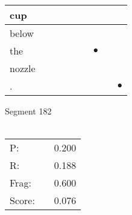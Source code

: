 \documentclass[landscape]{article}
\newcommand{\ssp}{\hspace{2pt}}
\newcommand{\mex}{\cellcolor{g}$\bullet$}
\begin{document}
\begin{tabular}{|l|p{10pt}|p{10pt}|p{10pt}|p{10pt}|p{10pt}|p{10pt}|p{10pt}|p{10pt}|}
\hline
\ssp cup \ssp&\hspace{2pt}&\hspace{2pt}&\hspace{2pt}&\hspace{2pt}&\hspace{2pt}&\hspace{2pt}&\hspace{2pt}&\hspace{2pt}\\
\hline
\ssp below \ssp&\hspace{2pt}&\hspace{2pt}&\hspace{2pt}&\hspace{2pt}&\hspace{2pt}&\hspace{2pt}&\hspace{2pt}&\hspace{2pt}\\
\hline
\ssp \cellcolor{ref5}the \ssp&\hspace{2pt}&\hspace{2pt}&\hspace{2pt}&\hspace{2pt}&\hspace{2pt}&\hspace{2pt}\mex&\hspace{2pt}&\hspace{2pt}\\
\hline
\ssp nozzle \ssp&\hspace{2pt}&\hspace{2pt}&\hspace{2pt}&\hspace{2pt}&\hspace{2pt}&\hspace{2pt}&\hspace{2pt}&\hspace{2pt}\\
\hline
\ssp \cellcolor{ref7}. \ssp&\hspace{2pt}&\hspace{2pt}&\hspace{2pt}&\hspace{2pt}&\hspace{2pt}&\hspace{2pt}&\hspace{2pt}&\hspace{2pt}\mex\\
\hline
\end{tabular}

\vspace{6pt}
\noindent Segment 182\\\\
\noindent\begin{tabular}{lm{12pt}r}
\hline
P:&&0.200\\
R:&&0.188\\
Frag:&&0.600\\
Score:&&0.076\\
\end{tabular}
\end{document}

